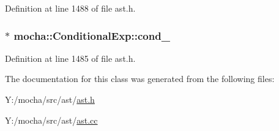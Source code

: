 Definition at line 1488 of file ast.h.

\hypertarget{classmocha_1_1_conditional_exp_ae648dcd906465556dc11277d756e5a08}{
\subsubsection[{cond\_\-}]{$\ast$ {\bf mocha::ConditionalExp::cond\_\-}}}
\label{classmocha_1_1_conditional_exp_ae648dcd906465556dc11277d756e5a08}


Definition at line 1485 of file ast.h.



The documentation for this class was generated from the following files:\begin{DoxyCompactItemize}
\item 
Y:/mocha/src/ast/\hyperlink{ast_8h}{ast.h}\item 
Y:/mocha/src/ast/\hyperlink{ast_8cc}{ast.cc}\end{DoxyCompactItemize}
